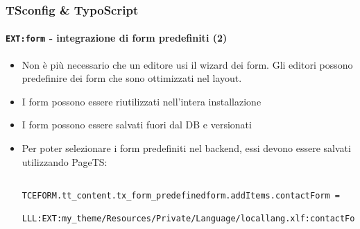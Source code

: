 \begin{frame}[fragile]
	\frametitle{TSconfig \& TypoScript}
	\framesubtitle{\texttt{EXT:form} - integrazione di form predefiniti (2)}

	\lstset{basicstyle=\tiny\ttfamily}

	\begin{itemize}

		\item Non è più necessario che un editore usi il wizard dei form.
			Gli editori possono predefinire dei form che sono ottimizzati nel layout.

		\item I form possono essere riutilizzati nell'intera installazione

		\item I form possono essere salvati fuori dal DB e versionati

		\item Per poter selezionare i form predefiniti nel backend,
			essi devono essere salvati utilizzando PageTS:

		\begin{lstlisting}
			TCEFORM.tt_content.tx_form_predefinedform.addItems.contactForm =
			  LLL:EXT:my_theme/Resources/Private/Language/locallang.xlf:contactForm
		\end{lstlisting}

	\end{itemize}

\end{frame}

